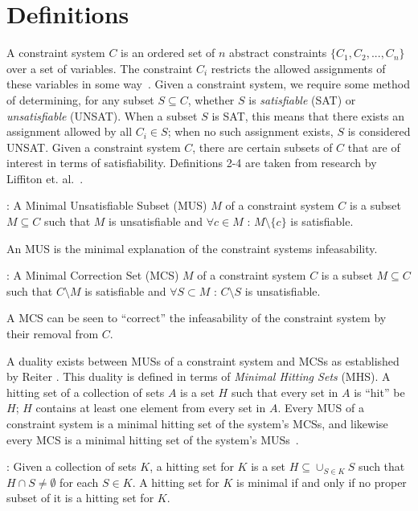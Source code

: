 \section{Definitions}
\label{sec:definitions}
A constraint system $C$ is an ordered set of $n$ abstract constraints $\{C_1, C_2, ..., C_n\}$ over a set of variables. The constraint $C_i$ restricts the allowed assignments of these variables in some way~\cite{liffiton2016fast}. Given a constraint system, we require some method of determining, for any subset $S \subseteq C$, whether $S$ is \textit{satisfiable} (SAT) or \textit{unsatisfiable} (UNSAT). When a subset $S$ is SAT, this means that there exists an assignment allowed by all $C_i \in S$; when no such assignment exists, $S$ is considered UNSAT. Given a constraint system $C$, there are certain subsets of $C$ that are of interest in terms of satisfiability. Definitions 2-4 are taken from research by Liffiton et. al.~\cite{liffiton2016fast}. 

\begin{definition} : A Minimal Unsatisfiable Subset (MUS) $M$ of a constraint system $C$ is a subset $M \subseteq C$ such that $M$ is unsatisfiable and $\forall c \in M$ : $M \setminus \{c\}$ is satisfiable. 
\end{definition}
An MUS is the minimal explanation of the constraint systems infeasability. 
\begin{definition} : A Minimal Correction Set (MCS) $M$ of a constraint system $C$ is a subset $M\subseteq C$ such that $C \setminus M$ is satisfiable and $\forall S \subset M$ : $C \setminus S$ is unsatisfiable. 
\end{definition}
A MCS can be seen to ``correct'' the infeasability of the constraint system by their removal from $C$.

A duality exists between MUSs of a constraint system and MCSs as established by Reiter \cite{reiter1987theory}. This duality is defined in terms of \textit{Minimal Hitting Sets} (MHS). A hitting set of a collection of sets $A$ is a set $H$ such that every set in $A$ is ``hit'' be $H$; $H$ contains at least one element from every set in $A$. Every MUS of a constraint system is a minimal hitting set of the system's MCSs, and likewise every MCS is a minimal hitting set of the system's MUSs~\cite{liffiton2016fast, reiter1987theory, de1987diagnosing}.
\begin{definition}: Given a collection of sets $K$, a hitting set for $K$ is a set $H \subseteq \cup_{S \in K} S$ such that $H \cap S \neq \emptyset$ for each $S  \in K$. A hitting set for $K$ is minimal if and only if no proper subset of it is a hitting set for $K$. 
\end{definition}

